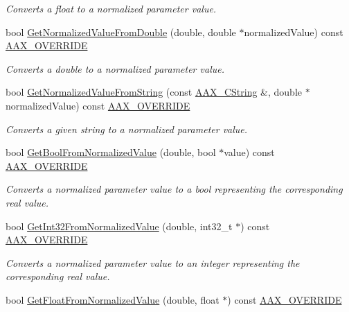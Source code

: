 \begin{Indent}
\begin{DoxyCompactItemize}
\begin{DoxyCompactList}\small\item\em Converts a float to a normalized parameter value. \end{DoxyCompactList}\item 
bool \mbox{\hyperlink{a01541_aaf62291f5f11b525545c05792e37b1fc}{Get\+Normalized\+Value\+From\+Double}} (double, double $\ast$normalized\+Value) const \mbox{\hyperlink{a00392_ac2f24a5172689ae684344abdcce55463}{A\+A\+X\+\_\+\+O\+V\+E\+R\+R\+I\+DE}}
\begin{DoxyCompactList}\small\item\em Converts a double to a normalized parameter value. \end{DoxyCompactList}\item 
bool \mbox{\hyperlink{a01541_a8aec94ce6920496c7be4a1bde5d581d9}{Get\+Normalized\+Value\+From\+String}} (const \mbox{\hyperlink{a01573}{A\+A\+X\+\_\+\+C\+String}} \&, double $\ast$normalized\+Value) const \mbox{\hyperlink{a00392_ac2f24a5172689ae684344abdcce55463}{A\+A\+X\+\_\+\+O\+V\+E\+R\+R\+I\+DE}}
\begin{DoxyCompactList}\small\item\em Converts a given string to a normalized parameter value. \end{DoxyCompactList}\item 
bool \mbox{\hyperlink{a01541_a301628412902aa8dae95fe7770234324}{Get\+Bool\+From\+Normalized\+Value}} (double, bool $\ast$value) const \mbox{\hyperlink{a00392_ac2f24a5172689ae684344abdcce55463}{A\+A\+X\+\_\+\+O\+V\+E\+R\+R\+I\+DE}}
\begin{DoxyCompactList}\small\item\em Converts a normalized parameter value to a bool representing the corresponding real value. \end{DoxyCompactList}\item 
bool \mbox{\hyperlink{a01541_a401422518ff853ee791fe1f4b0ea124c}{Get\+Int32\+From\+Normalized\+Value}} (double, int32\+\_\+t $\ast$) const \mbox{\hyperlink{a00392_ac2f24a5172689ae684344abdcce55463}{A\+A\+X\+\_\+\+O\+V\+E\+R\+R\+I\+DE}}
\begin{DoxyCompactList}\small\item\em Converts a normalized parameter value to an integer representing the corresponding real value. \end{DoxyCompactList}\item 
bool \mbox{\hyperlink{a01541_ade83fe1a6dd4bcc2c6290d36a4bec647}{Get\+Float\+From\+Normalized\+Value}} (double, float $\ast$) const \mbox{\hyperlink{a00392_ac2f24a5172689ae684344abdcce55463}{A\+A\+X\+\_\+\+O\+V\+E\+R\+R\+I\+DE}}

\end{DoxyCompactItemize}
\end{Indent}
